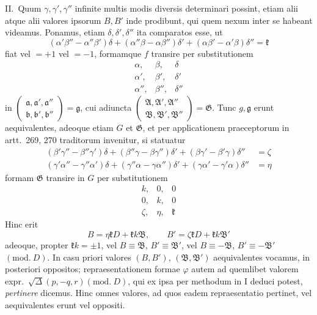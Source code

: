 II.\ Quum $\gamma,\gamma',\gamma''$ infinite multis modis diversis determinari
possint, etiam alii atque alii valores ipsorum $B,B'$ inde prodibunt, qui quem
nexum inter se habeant videamus. Ponamus, etiam $\delta,\delta',\delta''$ ita
comparatos esse, ut
\[
(\alpha'\beta''-\alpha''\beta')\delta+
(\alpha''\beta-\alpha\beta'')\delta'+
(\alpha\beta'-\alpha'\beta)\delta''=\mathfrak{k}
\]
fiat vel $=+1$ vel $=-1$, formamque $f$ transire per substitutionem
\[
\begin{array}{ccc}
\alpha,&\beta,&\delta\\
\alpha',&\beta',&\delta'\\
\alpha'',&\beta'',&\delta''
\end{array}
\]
in
$\left(\begin{smallmatrix}\mathfrak{a},\mathfrak{a}',\mathfrak{a}''\\\mathfrak{b},\mathfrak{b}',\mathfrak{b}''\end{smallmatrix}\right)=\mathfrak{g}$,
cui adiuncta
$\left(\begin{smallmatrix}\mathfrak{A},\mathfrak{A}',\mathfrak{A}''\\\mathfrak{B},\mathfrak{B}',\mathfrak{B}''\end{smallmatrix}\right)=\mathfrak{G}$.
Tunc $g,\mathfrak{g}$ erunt aequivalentes, adeoque etiam $G$ et $\mathfrak{G}$,
et per applicationem praeceptorum in artt.\ 269, 270 traditorum
invenitur, si statuatur
\[
\begin{aligned}
(\beta'\gamma''-\beta''\gamma')\delta+
(\beta''\gamma-\beta\gamma'')\delta'+
(\beta\gamma'-\beta'\gamma)\delta''&=\zeta\\
(\gamma'\alpha''-\gamma''\alpha')\delta+
(\gamma''\alpha-\gamma\alpha'')\delta'+
(\gamma\alpha'-\gamma'\alpha)\delta''&=\eta
\end{aligned}
\]
formam $\mathfrak{G}$ transire in $G$ per substitutionem
\[
\begin{array}{ccc}
k,&0,&0\\
0,&k,&0\\
\zeta,&\eta,&\mathfrak{k}
\end{array}
\]
Hinc erit
\[
B=\eta\mathfrak{k}D+\mathfrak{k}k\mathfrak{B},\qquad
B'=\zeta\mathfrak{k}D+\mathfrak{k}k\mathfrak{B}'
\]
adeoque, propter $\mathfrak{k}k=\pm1$, vel $B\equiv\mathfrak{B}$,
$B'\equiv\mathfrak{B}'$, vel $B\equiv-\mathfrak{B}$, $B'\equiv-\mathfrak{B}'$
$(\mathrm{mod.}\ D)$. In casu priori valores $(B,B')$, $(\mathfrak{B},\mathfrak{B}')$
aequivalentes vocamus, in posteriori oppositos; repraesentationem formae
$\varphi$ autem ad quemlibet valorem
expr.\ $\surd\Delta(p,\allowbreak -q,\allowbreak r)(\mathrm{mod.}\ D)$, qui ex ipsa per methodum in I
deduci potest, \textit{pertinere} dicemus. Hinc omnes valores, ad quos eadem
repraesentatio pertinet, vel aequivalentes erunt vel oppositi.

